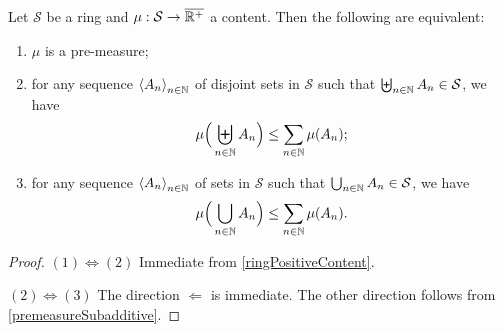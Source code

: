 \begin{lemma} \label{premeasureSubadditivityEquivalences}
Let $\mathcal{S}$ be a ring and $\mu: \mathcal{S} \to \overline{\mathbb{R}^+}$ a content. Then the following are equivalent:
\begin{enumerate}
\item $\mu$ is a pre-measure;
\item for any sequence $\left\langle A_n \right\rangle_{n\in \mathbb{N}}$ of disjoint sets in $\mathcal{S}$ such that $\biguplus_{n\in\mathbb{N}}A_n \in \mathcal{S}$, we have
\[ \mu\Big(\biguplus_{n\in\mathbb{N}}A_n\Big) \leq \sum_{n\in\mathbb{N}}\mu(A_n); \]
\item for any sequence $\left\langle A_n \right\rangle_{n\in \mathbb{N}}$ of sets in $\mathcal{S}$ such that $\bigcup_{n\in\mathbb{N}}A_n \in \mathcal{S}$, we have
\[ \mu\Big(\bigcup_{n\in\mathbb{N}}A_n\Big) \leq \sum_{n\in\mathbb{N}}\mu(A_n). \]
\end{enumerate}
\end{lemma}
\begin{proof}
$(1) \Leftrightarrow (2)$ Immediate from \ref{ringPositiveContent}.

$(2) \Leftrightarrow (3)$ The direction $\Leftarrow$ is immediate. The other direction follows from \ref{premeasureSubadditive}.
\end{proof}


